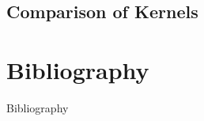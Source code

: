 \documentclass[aspectratio=169]{beamer}
\begin{document}
\subsection{Comparison of Kernels}



% 
% 
% 


% 

% 




% 
% 
% 


% 






\section{Bibliography}
\appendix
\begin{frame}{Bibliography}
    \printbibliography[heading=none]
\end{frame}
\end{document}
